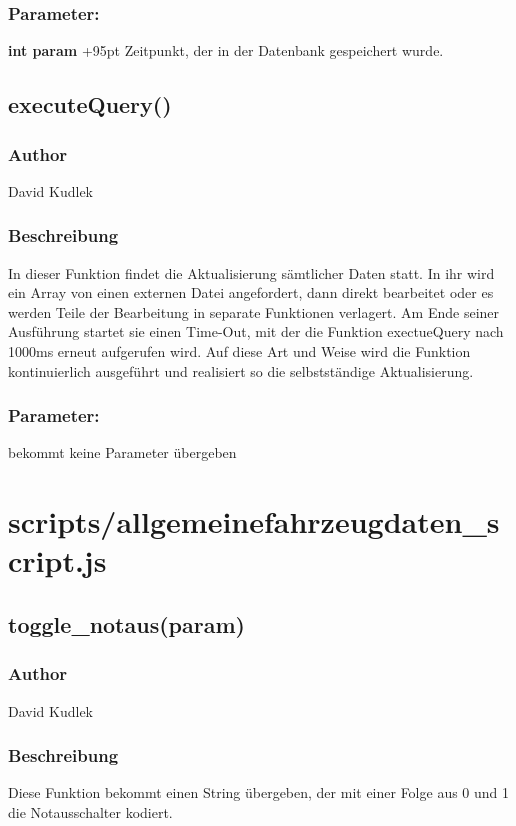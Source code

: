 \documentclass[fontsize = 12pt, paper = a4]{scrreprt}
\begin{document}
\subsubsection*{Parameter:}
\textbf{int param } 
\hspace{8mm}
\hangindent+95pt 
Zeitpunkt, der in der Datenbank gespeichert wurde.\\

\subsection*{executeQuery()}
\subsubsection*{Author}
David Kudlek
\subsubsection*{Beschreibung}
In dieser Funktion findet die Aktualisierung sämtlicher Daten statt. In ihr wird ein Array von einen externen Datei angefordert, dann direkt bearbeitet oder es werden Teile der Bearbeitung in separate Funktionen verlagert. Am Ende seiner Ausführung startet sie einen Time-Out, mit der die Funktion exectueQuery nach 1000ms erneut aufgerufen wird. Auf diese Art und Weise wird die Funktion kontinuierlich ausgeführt und realisiert so die selbstständige Aktualisierung. 
 	
\subsubsection*{Parameter:}
bekommt keine Parameter übergeben






\section{scripts/allgemeinefahrzeugdaten\_script.js}


\subsection*{toggle\_notaus(param)}
\subsubsection*{Author}
David Kudlek
\subsubsection*{Beschreibung}
Diese Funktion bekommt einen String übergeben, der mit einer Folge aus 0 und 1 die Notausschalter kodiert.  	
\end{document}
